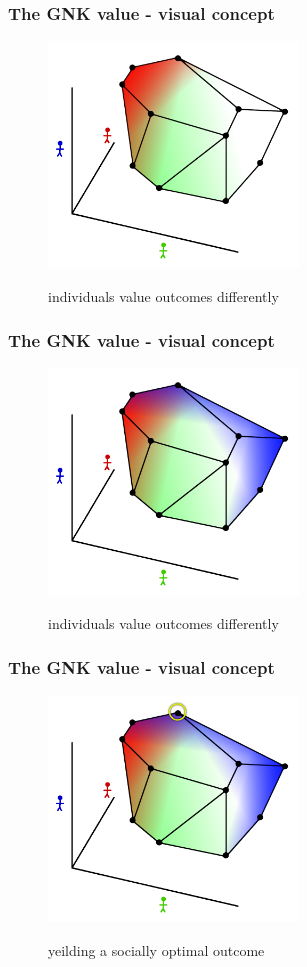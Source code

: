 \begin{frame} \frametitle{The GNK value - visual concept} \begin{figure} \begin{center} \includegraphics[height=6cm]{figs/pp7} \end{center} individuals value outcomes differently \end{figure} \end{frame}
\begin{frame} \frametitle{The GNK value - visual concept} \begin{figure} \begin{center} \includegraphics[height=6cm]{figs/pp8} \end{center} individuals value outcomes differently \end{figure} \end{frame}
\begin{frame} \frametitle{The GNK value - visual concept} \begin{figure} \begin{center} \includegraphics[height=6cm]{figs/pp9} \end{center} yeilding a socially optimal outcome \end{figure} \end{frame}
